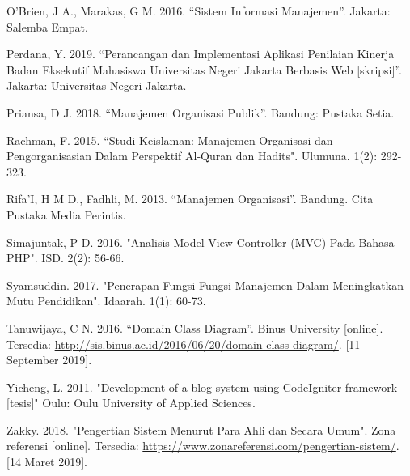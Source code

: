 \documentclass{jtetiskripsi}
\begin{document}
\begin{thebibliography}{99}
	 O’Brien, J A., Marakas, G M. 2016. “Sistem Informasi Manajemen”. Jakarta: Salemba Empat.
	
	 Perdana, Y. 2019. “Perancangan dan Implementasi Aplikasi Penilaian Kinerja Badan Eksekutif Mahasiswa Universitas Negeri Jakarta Berbasis Web [skripsi]”. Jakarta: Universitas Negeri Jakarta.
	
	 Priansa, D J. 2018. “Manajemen Organisasi Publik”. Bandung: Pustaka Setia.
	
	 Rachman, F. 2015. “Studi Keislaman: Manajemen Organisasi dan Pengorganisasian Dalam Perspektif Al-Quran dan Hadits". Ulumuna. 1(2): 292-323.
	
	
	 Rifa’I, H M D., Fadhli, M. 2013. “Manajemen Organisasi”. Bandung. Cita Pustaka Media Perintis.
	
	 Simajuntak, P D. 2016. "Analisis Model View Controller (MVC) Pada Bahasa PHP". ISD. 2(2): 56-66. 
	
	 Syamsuddin. 2017. "Penerapan Fungsi-Fungsi Manajemen Dalam Meningkatkan Mutu Pendidikan". Idaarah. 1(1): 60-73.
	
	 Tanuwijaya, C N. 2016. “Domain Class Diagram”. Binus University [online]. Tersedia: \url{http://sis.binus.ac.id/2016/06/20/domain-class-diagram/}. [11 September 2019].
	
	 Yicheng, L. 2011. "Development of a blog system using CodeIgniter framework [tesis]" Oulu: Oulu University of Applied Sciences.
	
	 Zakky. 2018. "Pengertian Sistem Menurut Para Ahli dan Secara Umum". Zona referensi [online]. Tersedia: \url{https://www.zonareferensi.com/pengertian-sistem/}. [14 Maret 2019]. 
		
	
\end{thebibliography}



%

%
\end{document}

